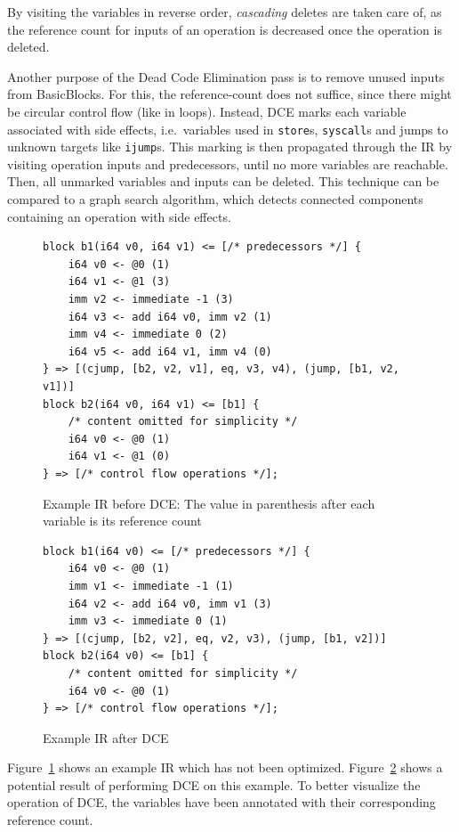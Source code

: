 \documentclass[course=eragp]{aspdoc}
\begin{document}
By visiting the variables in reverse order, \textit{cascading} deletes are taken care of, as the reference count for
inputs of an operation is decreased once the operation is deleted.

Another purpose of the Dead Code Elimination pass is to remove unused inputs from BasicBlocks. For this, the
reference-count does not suffice, since there might be circular control flow (like in loops). Instead, DCE marks each
variable associated with side effects, i.e.\ variables used in \texttt{store}s, \texttt{syscall}s and jumps to unknown
targets like \texttt{ijump}s. This marking is then propagated through the IR by visiting operation inputs and
predecessors, until no more variables are reachable. Then, all unmarked variables and inputs can be deleted. This
technique can be compared to a graph search algorithm, which detects connected components containing an operation with
side effects.

\begin{figure}[H]
    \centering
    \begin{lstlisting}[]
block b1(i64 v0, i64 v1) <= [/* predecessors */] {
    i64 v0 <- @0 (1)
    i64 v1 <- @1 (3)
    imm v2 <- immediate -1 (3)
    i64 v3 <- add i64 v0, imm v2 (1)
    imm v4 <- immediate 0 (2)
    i64 v5 <- add i64 v1, imm v4 (0)
} => [(cjump, [b2, v2, v1], eq, v3, v4), (jump, [b1, v2, v1])]
block b2(i64 v0, i64 v1) <= [b1] {
    /* content omitted for simplicity */
    i64 v0 <- @0 (1)
    i64 v1 <- @1 (0)
} => [/* control flow operations */];
\end{lstlisting}
    \caption{Example IR before DCE: The value in parenthesis after each variable is its reference count}\label{fig:dce_example_before}
\end{figure}

\begin{figure}[H]
    \centering
    \begin{lstlisting}[]
block b1(i64 v0) <= [/* predecessors */] {
    i64 v0 <- @0 (1)
    imm v1 <- immediate -1 (1)
    i64 v2 <- add i64 v0, imm v1 (3)
    imm v3 <- immediate 0 (1)
} => [(cjump, [b2, v2], eq, v2, v3), (jump, [b1, v2])]
block b2(i64 v0) <= [b1] {
    /* content omitted for simplicity */
    i64 v0 <- @0 (1)
} => [/* control flow operations */];
\end{lstlisting}
    \caption{Example IR after DCE}\label{fig:dce_example_after}
\end{figure}

Figure~\ref{fig:dce_example_before} shows an example IR which has not been optimized. Figure~\ref{fig:dce_example_after}
shows a potential result of performing DCE on this example. To better visualize the operation of DCE, the variables
have been annotated with their corresponding reference count.
\end{document}
